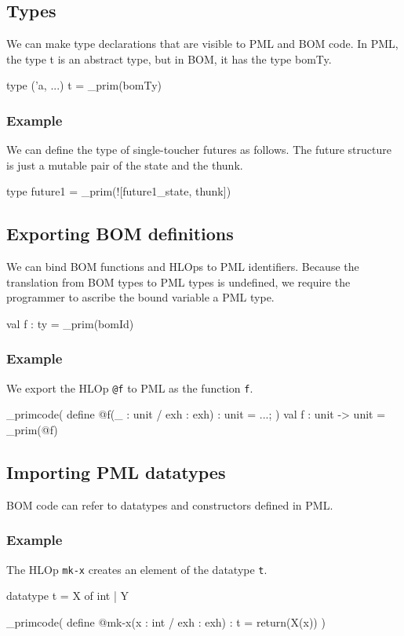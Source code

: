 \documentclass[11pt]{article}
\begin{document}
\subsection{Types}
We can make type declarations that are visible to PML and BOM code. In PML, the type t is an abstract type, but in BOM, it has the type bomTy.
\begin{centercode}
  type ('a, ...) t = _prim(bomTy)
\end{centercode}

\subsubsection{Example}
We can define the type of single-toucher futures as follows. The future structure is just a mutable pair of the state and the thunk.
\begin{centercode}
  type future1 = _prim(![future1_state, thunk])
\end{centercode}

\subsection{Exporting BOM definitions}
We can bind BOM functions and HLOps to PML identifiers. Because the translation from BOM types to PML types is undefined, we require the programmer to ascribe the bound variable a PML type. 
\begin{centercode}
  val f : ty = _prim(bomId)
\end{centercode}

\subsubsection{Example}
We export the HLOp \texttt{@f} to PML as the function \texttt{f}.
\begin{centercode}
  _primcode(
    define @f(_ : unit / exh : exh) : unit = ...;
  )
  val f : unit -> unit = _prim(@f)
\end{centercode}

\subsection{Importing PML datatypes}
BOM code can refer to datatypes and constructors defined in PML.

\subsubsection{Example}
The HLOp \texttt{mk-x} creates an element of the datatype \texttt{t}.
\begin{centercode}
  datatype t = X of int | Y
  
  _primcode(
    define @mk-x(x : int / exh : exh) : t =
      return(X(x))
  )
\end{centercode}
\end{document}
